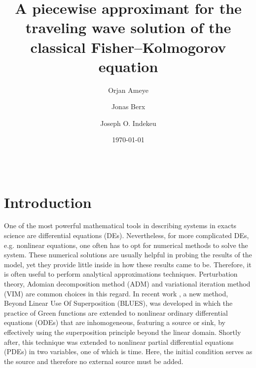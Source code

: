 \documentclass[amsmath,amssymb,amsfonts,aps,pre,preprint,superscriptaddress,bibnotes,showpacs,showkeys,longbibliography]{revtex4-1}
\begin{document}
\title{A piecewise approximant for the traveling wave solution of the classical Fisher–Kolmogorov equation}

\author{Orjan Ameye}

\author{Jonas Berx}

\author{Joseph O. Indekeu}

\date{\today}

\begin{abstract}
\lipsum[2-3]\\
\end{abstract}

\maketitle

\section{Introduction}\label{sec:intro}
One of the most powerful mathematical tools in describing systems in exacts science are differential equations (DEs). Nevertheless, for more complicated DEs, e.g. nonlinear equations, one often has to opt for numerical methods to solve the system. These numerical solutions are usually helpful in probing the results of the model, yet they provide little inside in how these results came to be. Therefore, it is often useful to perform analytical approximations techniques. Perturbation theory, Adomian decomposition method (ADM) and variational iteration method (VIM) are common choices in this regard. In recent work \cite{Berx_2020,Berx_2019}, a new method, Beyond Linear Use Of Superposition (BLUES), was developed in which the practice of Green functions are extended to nonlinear ordinary differential equations (ODEs) that are inhomogeneous, featuring a source or sink, by effectively using the superposition principle beyond the linear domain. Shortly after, this technique was extended to nonlinear partial differential equations (PDEs) \cite{Berx_2021} in two variables, one of which is time. Here, the initial condition serves as the source and therefore no external source must be added.
\end{document}

